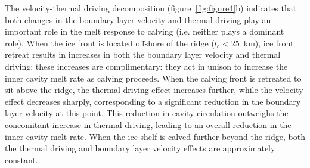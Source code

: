 \documentclass[draft]{agujournal2019}
\begin{document}
The velocity-thermal driving decomposition (figure~\ref{fig:figure4}b) indicates that both changes in the boundary layer velocity and thermal driving play an important role in the melt response to calving (i.e. neither plays a dominant role).  When the ice front is located offshore of the ridge ($l_c < 25$~km), ice front retreat results in increases in both the boundary layer velocity and thermal driving; these increases are complimentary: they act in unison to increase the inner cavity melt rate as calving proceeds. When the calving front is retreated to sit above the ridge, the thermal driving effect increases further, while the velocity effect decreases sharply, corresponding to a significant reduction in the boundary layer velocity at this point. This reduction in cavity circulation outweighs the concomitant increase in thermal driving, leading to an overall reduction in the inner cavity melt rate. When the ice shelf is calved further beyond the ridge, both the thermal driving and boundary layer velocity effects are approximately constant.
\end{document}
